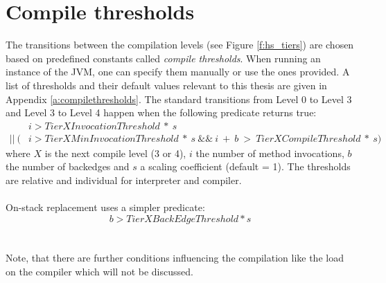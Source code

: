 \section{Compile thresholds}
\label{s:compilethresholds}
The transitions between the compilation levels (see Figure \ref{f:hs_tiers}) are chosen based on predefined constants called \textit{compile thresholds}. When running an instance of the JVM, one can specify them manually or use the ones provided. A list of thresholds and their default values relevant to this thesis are given in Appendix \ref{a:compilethresholds}.
The standard transitions from Level 0 to Level 3 and Level 3 to Level 4 happen when the following predicate returns true:
\begin{align*}
& i > TierXInvocationThreshold \ * \ s \\
 || \ (&i > TierXMinInvocationThreshold \ * \ s \ \&\& \ i \ + \ b \ > \ TierXCompileThreshold \ * \ s) 
\end{align*}
where $X$ is the next compile level (3 or 4), $i$ the number of method invocations, $b$ the number of backedges and $s$ a scaling coefficient (default = 1).
The thresholds are relative and individual for interpreter and compiler.
\\\\
On-stack replacement uses a simpler predicate:
$$b > TierXBackEdgeThreshold * s$$
\\\\
Note, that there are further conditions influencing the compilation like the load on the compiler which will not be discussed.
